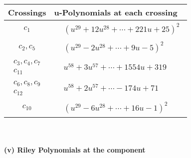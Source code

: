 \documentclass[1p]{elsarticle_modified}
\theoremstyle{definition}
\begin{document}
\begin{tabular}{m{50pt}|m{274pt}}
Crossings & \hspace{64pt}u-Polynomials at each crossing \\
\hline $$\begin{aligned}c_{1}\end{aligned}$$&$\begin{aligned}
&(u^{29}+12 u^{28}+\cdots+221 u+25)^{2}
\end{aligned}$\\
\hline $$\begin{aligned}c_{2},c_{5}\end{aligned}$$&$\begin{aligned}
&(u^{29}-2 u^{28}+\cdots+9 u-5)^{2}
\end{aligned}$\\
\hline $$\begin{aligned}c_{3},c_{4},c_{7}\\c_{11}\end{aligned}$$&$\begin{aligned}
&u^{58}+3 u^{57}+\cdots+1554 u+319
\end{aligned}$\\
\hline $$\begin{aligned}c_{6},c_{8},c_{9}\\c_{12}\end{aligned}$$&$\begin{aligned}
&u^{58}+2 u^{57}+\cdots-174 u+71
\end{aligned}$\\
\hline $$\begin{aligned}c_{10}\end{aligned}$$&$\begin{aligned}
&(u^{29}-6 u^{28}+\cdots+16 u-1)^{2}
\end{aligned}$\\
\hline
\end{tabular}\\~\\
\newpage\renewcommand{\arraystretch}{1}
\flushleft \textbf{(v) Riley Polynomials at the component}\newline \\
\end{document}
